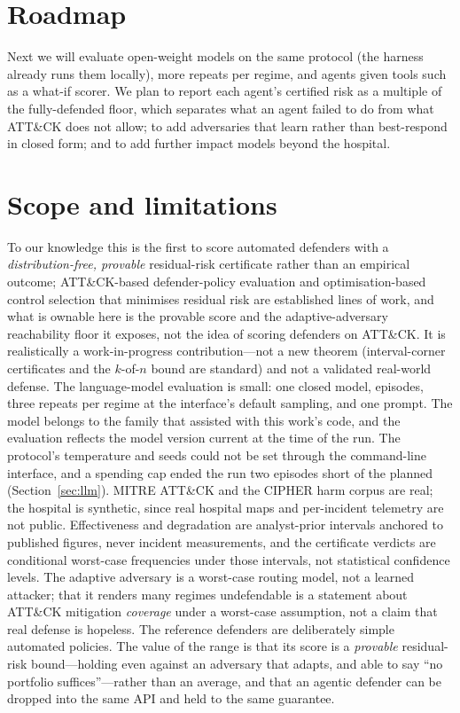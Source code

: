 \documentclass[conference,compsoc]{IEEEtran}
\begin{document}
\section{Roadmap}
Next we will evaluate open-weight models on the same protocol (the harness already runs
them locally), more repeats per regime, and agents given tools such as a what-if scorer.
We plan to report each agent's
certified risk as a multiple of the fully-defended floor, which separates what an agent
failed to do from what ATT\&CK does not allow; to add adversaries that learn rather than
best-respond in closed form; and to add further impact models beyond the hospital.

\section{Scope and limitations}
To our knowledge this is the first to score automated defenders with a
\emph{distribution-free, provable} residual-risk certificate rather than an empirical
outcome; ATT\&CK-based defender-policy evaluation and optimisation-based control
selection that minimises residual risk are established lines of work, and what is
ownable here is the provable score and the adaptive-adversary reachability floor it
exposes, not the idea of scoring defenders on ATT\&CK. It is realistically a
work-in-progress contribution---not a new theorem (interval-corner certificates and the
$k$-of-$n$ bound are standard) and not a validated real-world defense.
The language-model evaluation is small: one closed model, \ClEpisodes{} episodes, three
repeats per regime at the interface's default sampling, and one prompt. The model belongs
to the family that assisted with this work's code, and the evaluation reflects the model
version current at the time of the run. The protocol's temperature and seeds could not be
set through the command-line interface, and a spending cap ended the run two episodes
short of the planned \LlmEpisodes{} (Section~\ref{sec:llm}).
MITRE ATT\&CK and the CIPHER harm corpus are real; the hospital is synthetic, since
real hospital maps and per-incident telemetry are not public. Effectiveness and
degradation are analyst-prior intervals anchored to published figures, never incident
measurements, and the certificate verdicts are conditional worst-case frequencies
under those intervals, not statistical confidence levels. The adaptive adversary is a
worst-case routing model, not a learned attacker; that it renders many regimes
undefendable is a statement about ATT\&CK mitigation \emph{coverage} under a
worst-case assumption, not a claim that real defense is hopeless. The reference
defenders are deliberately simple automated policies. The value of the range is that
its score is a \emph{provable} residual-risk bound---holding even against an
adversary that adapts, and able to say ``no portfolio suffices''---rather than an
average, and that an agentic defender can be dropped into the same API and held to
the same guarantee.
\end{document}
